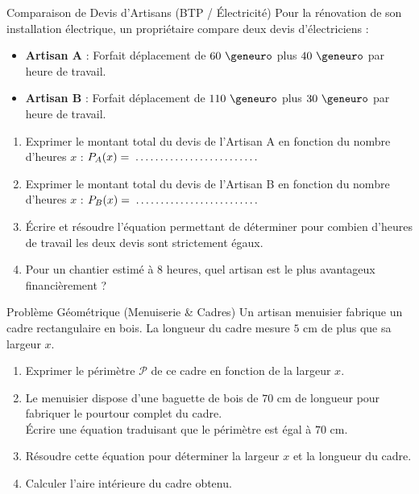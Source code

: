 \begin{exercice}[4 pts]{\capAnalyser}{Comparaison de Devis d'Artisans (BTP / Électricité)}
Pour la rénovation de son installation électrique, un propriétaire compare deux devis d'électriciens :
\begin{itemize}
    \item \textbf{Artisan A} : Forfait déplacement de $60\text{ \euro{}}$ plus $40\text{ \euro{}}$ par heure de travail.
    \item \textbf{Artisan B} : Forfait déplacement de $110\text{ \euro{}}$ plus $30\text{ \euro{}}$ par heure de travail.
\end{itemize}

\begin{enumerate}
    \item Exprimer le montant total du devis de l'Artisan A en fonction du nombre d'heures $x$ : $P_A(x) = \pointille[4cm]$
    \item Exprimer le montant total du devis de l'Artisan B en fonction du nombre d'heures $x$ : $P_B(x) = \pointille[4cm]$
    \item Écrire et résoudre l'équation permettant de déterminer pour combien d'heures de travail les deux devis sont strictement égaux.
    \item Pour un chantier estimé à $8\text{ heures}$, quel artisan est le plus avantageux financièrement ?
\end{enumerate}
\lignesreponse[6]
\end{exercice}

\begin{exercice}[5 pts]{\capAnalyser}{Problème Géométrique (Menuiserie \& Cadres)}
Un artisan menuisier fabrique un cadre rectangulaire en bois.
La longueur du cadre mesure $5\text{ cm}$ de plus que sa largeur $x$.

\begin{center}
\end{center}

\begin{enumerate}
    \item Exprimer le périmètre $\mathcal{P}$ de ce cadre en fonction de la largeur $x$.
    \item Le menuisier dispose d'une baguette de bois de $70\text{ cm}$ de longueur pour fabriquer le pourtour complet du cadre.\\
    Écrire une équation traduisant que le périmètre est égal à $70\text{ cm}$.
    \item Résoudre cette équation pour déterminer la largeur $x$ et la longueur du cadre.
    \item Calculer l'aire intérieure du cadre obtenu.
\end{enumerate}
\lignesreponse[6]
\end{exercice}

